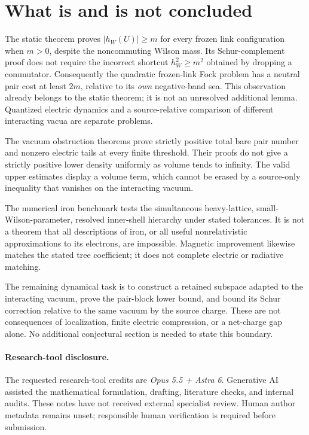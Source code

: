 \section{What is and is not concluded}

The static theorem proves $|h_W(U)|\ge m$ for every frozen link
configuration when $m>0$, despite the noncommuting Wilson mass.
Its Schur-complement proof does not require the incorrect shortcut
$h_W^2\ge m^2$ obtained by dropping a commutator. Consequently the
quadratic frozen-link Fock problem has a neutral pair cost at least
$2m$, relative to its \emph{own} negative-band sea.
This observation already belongs to the static theorem; it is not
an unresolved additional lemma. Quantized electric dynamics and a
source-relative comparison of different interacting vacua are
separate problems.

The vacuum obstruction theorems prove strictly positive total bare
pair number and nonzero electric tails at every finite threshold.
Their proofs do not give a strictly positive lower density uniformly
as volume tends to infinity. The valid upper estimates display a
volume term, which cannot be erased by a source-only inequality
that vanishes on the interacting vacuum.

The numerical iron benchmark tests the simultaneous heavy-lattice,
small-Wilson-parameter, resolved inner-shell hierarchy under stated
tolerances. It is not a theorem that all descriptions of iron,
or all useful nonrelativistic approximations to its electrons,
are impossible. Magnetic improvement likewise matches the stated
tree coefficient; it does not complete electric or radiative matching.

The remaining dynamical task is to construct a retained subspace
adapted to the interacting vacuum, prove the pair-block lower bound,
and bound its Schur correction relative to the same vacuum by the
source charge. These are not consequences of localization, finite
electric compression, or a net-charge gap alone. No additional
conjectural section is needed to state this boundary.

\paragraph{Research-tool disclosure.}
The requested research-tool credits are \emph{Opus 5.5 + Astra 6}.
Generative AI assisted the mathematical formulation, drafting,
literature checks, and internal audits. These notes have not received
external specialist review. Human author metadata remains unset;
responsible human verification is required before submission.
